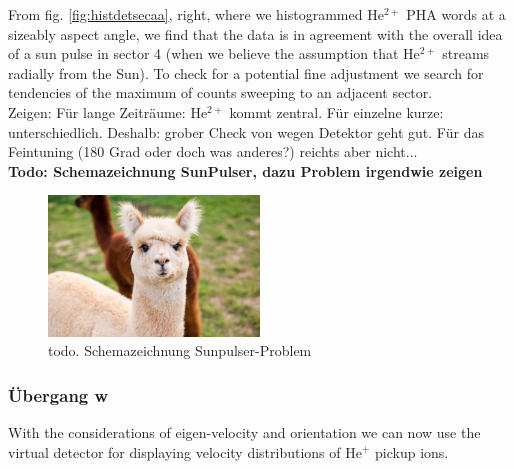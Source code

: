 From fig. \ref{fig:histdetsecaa}, right, where we histogrammed $\mathrm{He^{2+}}$ PHA words at a sizeably aspect angle, we find that the data is in agreement with the overall idea of a sun pulse in sector 4 (when we believe the assumption that $\mathrm{He^{2+}}$ streams radially from the Sun). 
To check for a potential fine adjustment we search for tendencies of the maximum of counts sweeping to an adjacent sector.
\\
Zeigen: Für lange Zeiträume: $\mathrm{He^{2+}}$ kommt zentral. Für einzelne kurze: unterschiedlich.
Deshalb: grober Check von wegen Detektor geht gut. Für das Feintuning (180 Grad oder doch was anderes?) reichts aber nicht...
\\
\textbf{Todo: Schemazeichnung SunPulser, dazu Problem irgendwie zeigen}
\begin{figure}[h]
	\includegraphics[width=0.5\textwidth]{Figures/dummy.jpg}
	\centering
	\caption{todo. Schemazeichnung Sunpulser-Problem}
	\label{fig:sp}
\end{figure}
\subsubsection{Übergang w}
With the considerations of eigen-velocity and orientation we can now use the virtual detector for displaying velocity distributions of $\mathrm{He^{+}}$ pickup ions. 

